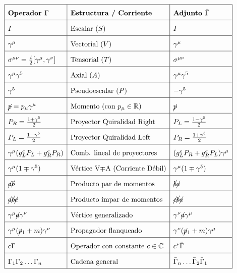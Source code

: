 $$\renewcommand{\arraystretch}{1.8}
\begin{array}{|l|l|l|}
\hline
\textbf{Operador } \Gamma & \textbf{Estructura / Corriente} & \textbf{Adjunto } \bar{\Gamma} \\
\hline
I & \text{Escalar } (S) & I \\
\hline
\gamma^\mu & \text{Vectorial } (V) & \gamma^\mu \\
\hline
\sigma^{\mu\nu} = \frac{i}{2}[\gamma^\mu, \gamma^\nu] & \text{Tensorial } (T) & \sigma^{\mu\nu} \\
\hline
\gamma^\mu \gamma^5 & \text{Axial } (A) & \gamma^\mu \gamma^5 \\
\hline
\gamma^5 & \text{Pseudoescalar } (P) & -\gamma^5 \\
\hline
\cancel{p} = p_\mu \gamma^\mu & \text{Momento (con } p_\mu \in \mathbb{R} \text{)} & \cancel{p} \\
\hline
P_R = \frac{1 + \gamma^5}{2} & \text{Proyector Quiralidad Right} & P_L = \frac{1 - \gamma^5}{2} \\
\hline
P_L = \frac{1 - \gamma^5}{2} & \text{Proyector Quiralidad Left} & P_R = \frac{1 + \gamma^5}{2} \\
\hline
\gamma^\mu (g_L^e P_L + g^e_R P_R)&\text{Comb. lineal de proyectores}& (g_L^e P_R + g^e_R P_L)\gamma^\mu\\
\hline
\gamma^\mu (1 \mp \gamma^5) & \text{Vértice V$\mp$A (Corriente Débil)} & \gamma^\mu (1 \mp \gamma^5) \\
\hline
\cancel{a}\cancel{b} & \text{Producto par de momentos} & \cancel{b}\cancel{a} \\
\hline
\cancel{a}\cancel{b}\cancel{c} & \text{Producto impar de momentos} & \cancel{c}\cancel{b}\cancel{a} \\
\hline
\gamma^\mu \cancel{a} \gamma^\nu & \text{Vértice generalizado} & \gamma^\nu \cancel{a} \gamma^\mu \\
\hline
\gamma^\mu (\cancel{p}_1 + m) \gamma^\nu & \text{Propagador flanqueado} & \gamma^\nu (\cancel{p}_1 + m) \gamma^\mu \\
\hline
c \Gamma & \text{Operador con constante } c \in \mathbb{C} & c^* \bar{\Gamma} \\
\hline
\Gamma_1 \Gamma_2 \dots \Gamma_n & \text{Cadena general} & \bar{\Gamma}_n \dots \bar{\Gamma}_2 \bar{\Gamma}_1 \\
\hline
\end{array}$$


